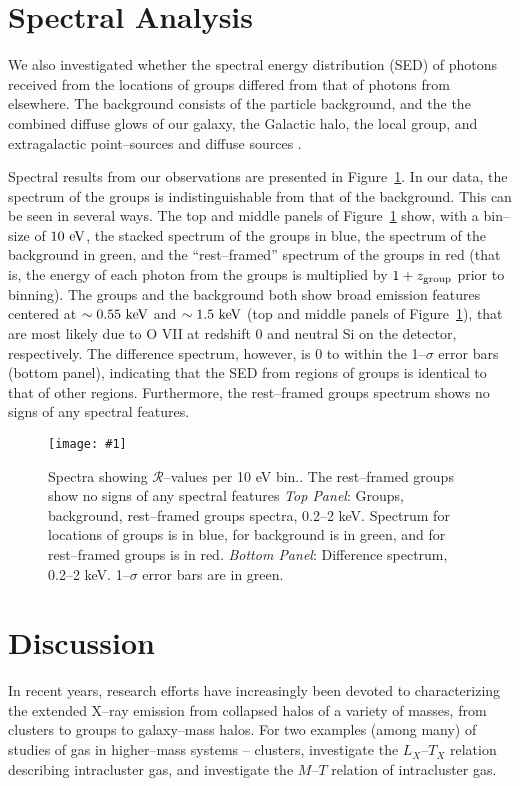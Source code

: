 \documentclass[12pt,preprint]{aastex}
\def\plotone#1{\centering \leavevmode
\texttt{[image: \#1]}}
\newcommand{\R}[0]{\mathcal{R}}
\begin{document}
\section{Spectral Analysis}
\label{sec:spec}
We also investigated whether the spectral energy distribution (SED) of
photons received from the locations of groups differed from that of
photons from elsewhere.  The background consists of the particle
background, and the the combined diffuse glows of our galaxy, the
Galactic halo, the local group, and extragalactic point--sources and
diffuse sources \citep{mccammon+sanders1990, mccammon_et_al2002}.

Spectral results from our observations are presented in
Figure~\ref{fig:spec}.  In our data, the spectrum of the groups is
indistinguishable from that of the background.  This can be seen in
several ways.  The top and middle panels of Figure~\ref{fig:spec} show,
with a bin--size of $10 {\rm~eV}$, the stacked spectrum of the groups in
blue, the spectrum of the background in green, and the ``rest--framed''
spectrum of the groups in red (that is, the energy of each photon from the
groups is multiplied by $1+z_ {\rm group}$ prior to binning).  The groups
and the background both show broad emission features centered at $\sim
0.55 {\rm~keV}$ and $\sim 1.5 {\rm~keV}$ (top and middle panels of
Figure~\ref{fig:spec}), that are most likely due to O VII at redshift 0
and neutral Si on the detector, respectively.
The difference spectrum, however, is
0 to within the 1--$\sigma$ error bars (bottom panel), indicating that the SED
from regions of groups is identical to that of other regions.  Furthermore, the
rest--framed groups spectrum shows no signs of any spectral features.

\begin{figure}[thb]
\plotone{figs/bspec.eps}
\caption{Spectra showing $\R$--values per 10 eV bin..  The rest--framed groups
show no signs of any spectral features
{\it Top Panel}: Groups, background, rest--framed groups spectra, 0.2--2 keV.
Spectrum for locations of groups is in blue, for background is in green, and
for rest--framed groups is in red.
{\it Bottom Panel}: Difference spectrum, 0.2--2 keV.  1--$\sigma$ error bars
are in green.}
\label{fig:spec}
\end{figure}

\section{Discussion}
\label{sec:disc}
In recent years, research efforts have increasingly been devoted to
characterizing the extended X--ray emission from collapsed halos of a variety
of masses, from clusters to groups to galaxy--mass halos.  For two examples
(among many) of studies of gas in higher--mass systems -- clusters,
\citet*{akahori+masai2005} investigate the $L_X$--$T_X$ relation describing
intracluster gas, and \citet*{arnaud_et_al2005} investigate the
$M$--$T$ relation of intracluster gas.
\end{document}
